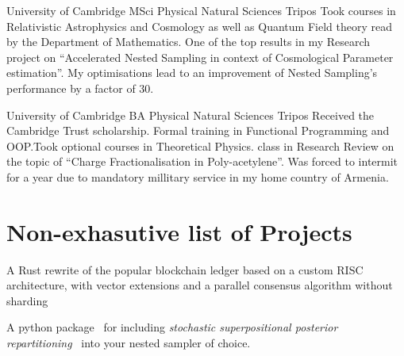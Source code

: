 \documentclass{CurriculumVitae}[10pt, condensed]
\begin{document}
{   {University of Cambridge} {MSci }
  {Physical Natural Sciences Tripos} {Took courses in Relativistic
    Astrophysics and Cosmology as well as Quantum Field theory read by
    the Department of Mathematics. One of the top results in my
    Research project on ``Accelerated Nested Sampling in context of
    Cosmological Parameter estimation''. My optimisations lead to an
    improvement of Nested Sampling's performance by a factor of 30. }

  {University of Cambridge} {BA }{Physical Natural Sciences
    Tripos} {Received the Cambridge Trust scholarship. Formal training
    in Functional Programming and OOP.\@ Took optional courses in
    Theoretical Physics.  class in Research Review on the topic
    of ``Charge Fractionalisation in Poly-acetylene''. Was forced to
    intermit for a year due to mandatory millitary service in my home
    country of Armenia. }

  \section*{Non-exhasutive list of Projects}%
  {A Rust rewrite of the popular blockchain ledger based on a custom
    RISC architecture, with vector extensions and a parallel consensus
    algorithm without sharding}

    

  

   {A
    python package~\cite{sspr-maxent} for including \emph{stochastic
      superpositional posterior repartitioning}~\cite{sspr} into your
    nested sampler of choice.}

}
\end{document}
